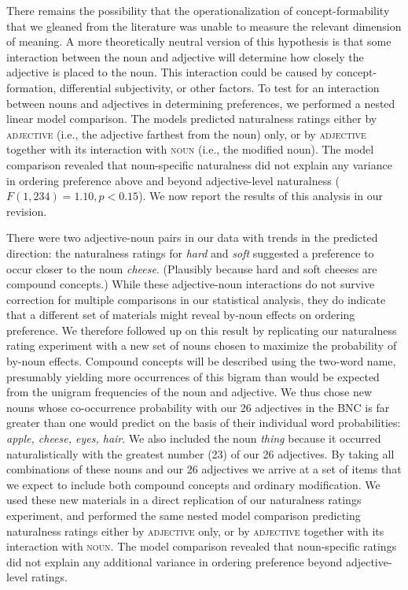 \documentclass[12pt]{article}
\begin{document}
There remains the possibility that the operationalization of concept-formability that we gleaned from the literature was unable to measure the relevant dimension of meaning. A more theoretically neutral version of this hypothesis is that some interaction between the noun and adjective will determine how closely the adjective is placed to the noun. This interaction could be caused by concept-formation, differential subjectivity, or other factors. To test for an interaction between nouns and adjectives in determining preferences, we performed a nested linear model comparison. The models predicted naturalness ratings either by \textsc{adjective} (i.e., the adjective farthest from the noun) only, or by \textsc{adjective} together with its interaction with \textsc{noun} (i.e., the modified noun).	The model comparison revealed  that noun-specific naturalness did not explain any variance in ordering preference above and beyond adjective-level naturalness ($F(1,234) = 1.10, p < 0.15$). We now report the results of this analysis in our revision.

There were two adjective-noun pairs in our data with trends in the predicted direction: the naturalness ratings for \emph{hard} and \emph{soft} suggested a preference to occur closer to the noun \emph{cheese}. (Plausibly because hard and soft cheeses are compound concepts.) While these adjective-noun interactions do not survive correction for multiple comparisons in our statistical analysis, they do indicate that a different set of materials might reveal by-noun effects on ordering preference. We therefore followed up on this result by replicating our naturalness rating experiment with a new set of nouns chosen to maximize the probability of by-noun effects.
Compound concepts will be described using the two-word name, presumably yielding more occurrences of this bigram than would be expected from the unigram frequencies of the noun and adjective.
We thus chose new nouns whose co-occurrence probability with our 26 adjectives in the BNC is far greater than one would predict on the basis of their individual word probabilities: \emph{apple, cheese, eyes, hair}. We also included the noun \emph{thing} because it occurred naturalistically with the greatest number (23) of our 26 adjectives.
By taking all combinations of these nouns and our 26 adjectives we arrive at a set of items that we expect to include both compound concepts and ordinary modification.
We used these new materials in a direct replication of our naturalness ratings experiment, and performed the same nested model comparison predicting naturalness ratings either by \textsc{adjective} only, or by \textsc{adjective} together with its interaction with \textsc{noun}. The model comparison revealed that noun-specific ratings did not explain any additional variance in ordering preference beyond adjective-level ratings.
\end{document}
